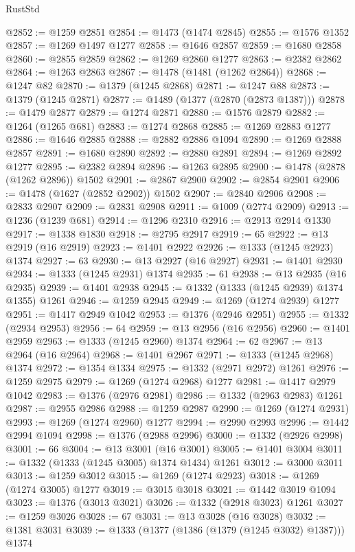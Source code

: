 \begin{lexlean}{RustStd}
\begin{coremodule}
{\begin{coremodule}
{{{{{{{{{{{{{{{{{{{{{{{{{{{{{{{{{{{@2852 := @1259 @2851
@2854 := @1473 (@1474 @2845)
@2855 := @1576 @1352
@2857 := @1269 @1497 @1277
@2858 := @1646 @2857
@2859 := @1680 @2858
@2860 := @2855 @2859
@2862 := @1269 @2860 @1277
@2863 := @2382 @2862
@2864 := @1263 @2863
@2867 := @1478 (@1481 (@1262 @2864))
@2868 := @1247 @82
@2870 := @1379 (@1245 @2868)
@2871 := @1247 @88
@2873 := @1379 (@1245 @2871)
@2877 := @1489 (@1377 (@2870 (@2873 @1387)))
@2878 := @1479 @2877
@2879 := @1274 @2871
@2880 := @1576 @2879
@2882 := @1264 (@1265 @681)
@2883 := @1274 @2868
@2885 := @1269 @2883 @1277
@2886 := @1646 @2885
@2888 := @2882 @2886 @1094
@2890 := @1269 @2888 @2857
@2891 := @1680 @2890
@2892 := @2880 @2891
@2894 := @1269 @2892 @1277
@2895 := @2382 @2894
@2896 := @1263 @2895
@2900 := @1478 (@2878 (@1262 @2896)) @1502
@2901 := @2867 @2900
@2902 := @2854 @2901
@2906 := @1478 (@1627 (@2852 @2902)) @1502
@2907 := @2840 @2906
@2908 := @2833 @2907
@2909 := @2831 @2908
@2911 := @1009 (@2774 @2909)
@2913 := @1236 (@1239 @681)
@2914 := @1296 @2310
@2916 := @2913 @2914 @1330
@2917 := @1338 @1830
@2918 := @2795 @2917
@2919 := 65
@2922 := @13 @2919 (@16 @2919)
@2923 := @1401 @2922
@2926 := @1333 (@1245 @2923) @1374
@2927 := 63
@2930 := @13 @2927 (@16 @2927)
@2931 := @1401 @2930
@2934 := @1333 (@1245 @2931) @1374
@2935 := 61
@2938 := @13 @2935 (@16 @2935)
@2939 := @1401 @2938
@2945 := @1332 (@1333 (@1245 @2939) @1374 @1355) @1261
@2946 := @1259 @2945
@2949 := @1269 (@1274 @2939) @1277
@2951 := @1417 @2949 @1042
@2953 := @1376 (@2946 @2951)
@2955 := @1332 (@2934 @2953)
@2956 := 64
@2959 := @13 @2956 (@16 @2956)
@2960 := @1401 @2959
@2963 := @1333 (@1245 @2960) @1374
@2964 := 62
@2967 := @13 @2964 (@16 @2964)
@2968 := @1401 @2967
@2971 := @1333 (@1245 @2968) @1374
@2972 := @1354 @1334
@2975 := @1332 (@2971 @2972) @1261
@2976 := @1259 @2975
@2979 := @1269 (@1274 @2968) @1277
@2981 := @1417 @2979 @1042
@2983 := @1376 (@2976 @2981)
@2986 := @1332 (@2963 @2983) @1261
@2987 := @2955 @2986
@2988 := @1259 @2987
@2990 := @1269 (@1274 @2931)
@2993 := @1269 (@1274 @2960) @1277
@2994 := @2990 @2993
@2996 := @1442 @2994 @1094
@2998 := @1376 (@2988 @2996)
@3000 := @1332 (@2926 @2998)
@3001 := 66
@3004 := @13 @3001 (@16 @3001)
@3005 := @1401 @3004
@3011 := @1332 (@1333 (@1245 @3005) @1374 @1434) @1261
@3012 := @3000 @3011
@3013 := @1259 @3012
@3015 := @1269 (@1274 @2923)
@3018 := @1269 (@1274 @3005) @1277
@3019 := @3015 @3018
@3021 := @1442 @3019 @1094
@3023 := @1376 (@3013 @3021)
@3026 := @1332 (@2918 @3023) @1261
@3027 := @1259 @3026
@3028 := 67
@3031 := @13 @3028 (@16 @3028)
@3032 := @1381 @3031
@3039 := @1333 (@1377 (@1386 (@1379 (@1245 @3032) @1387))) @1374
}}}}}}}}}}}}}}}}}}}}}}}}}}}}}}}}}}}
\end{coremodule}}
\end{coremodule}
\end{lexlean}
